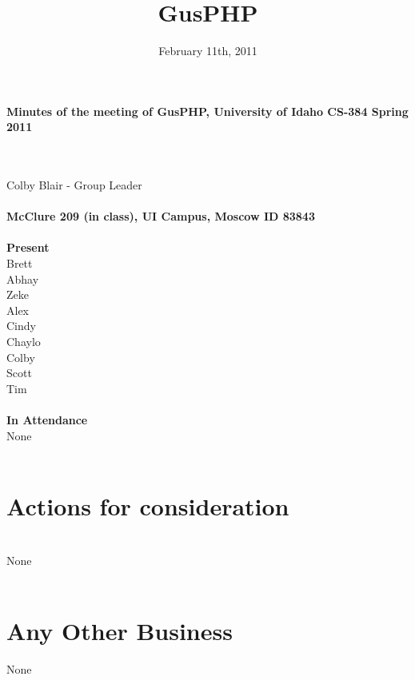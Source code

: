 \documentclass[12pt]{article}
\title{GusPHP}
\date{February 11th, 2011}
\begin{document}
\maketitle
\begin{center}\textbf{Minutes of the meeting of GusPHP, University of Idaho CS-384 Spring 2011} \end{center} \\ 
\\
Colby Blair - Group Leader\\ 
\\
\textbf{McClure 209 (in class), UI Campus, Moscow ID 83843} \\ 
\\
\textbf{Present}\\ 
Brett\\
Abhay\\
Zeke\\
Alex\\
Cindy\\
Chaylo\\
Colby\\
Scott\\
Tim\\
\\
\textbf{In Attendance}\\
None \\
\\
\section{Actions for consideration} \\
None \\
\\
\section{Any Other Business}
None \\
\\
\end{document}
